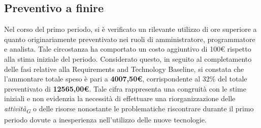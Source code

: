 \subsection{Preventivo a finire}
Nel corso del primo periodo, si è verificato un rilevante utilizzo di ore superiore a quanto originariamente preventivato nei ruoli di amministratore, programmatore e analista. Tale circostanza ha comportato un costo aggiuntivo di 100€ rispetto alla stima iniziale del periodo.
Considerato questo, in seguito al completamento delle fasi relative alla Requirements and Technology Baseline, si constata che l'ammontare totale speso è pari a \textbf{4007,50€}, corrispondente al 32\% del totale preventivato di \textbf{12565,00€}.
Tale cifra rappresenta una congruità con le stime iniziali e non evidenzia la necessità di effettuare una riorganizzazione delle \textit{attività}\textsubscript{\textit{G}} o delle risorse nonostante le problematiche riscontrare durante il primo periodo dovute a inesperienza nell'utilizzo delle nuove tecnologie.
